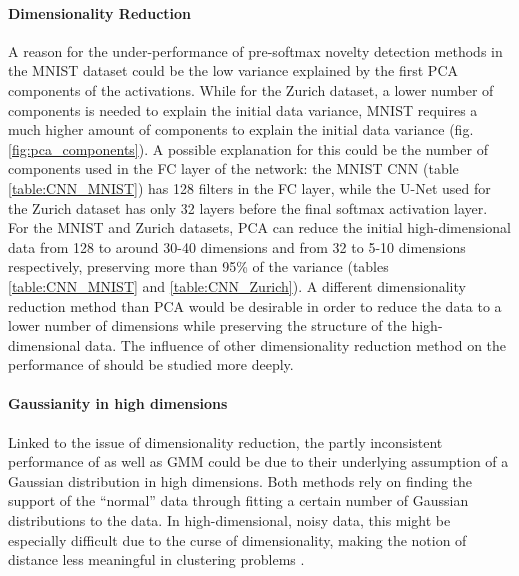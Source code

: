 \documentclass[10pt]{article}
\begin{document}
\paragraph{Dimensionality  Reduction} A reason for the under-performance of pre-softmax novelty detection methods in the \gls{MNIST} dataset could be the low variance explained by the first \gls{PCA} components of the activations. While for the Zurich dataset, a lower number of components is needed to explain the initial data variance, \gls{MNIST} requires a much higher amount of components to explain the initial data variance (fig. \ref{fig:pca_components}). A possible explanation for this could be the number of components used in the \gls{FC} layer of the network: the \gls{MNIST} \gls{CNN} (table \ref{table:CNN_MNIST}) has 128 filters in the \gls{FC} layer, while the U-Net used for the Zurich dataset has only 32 layers before the final softmax activation layer. For the \gls{MNIST} and Zurich datasets, \gls{PCA} can reduce the initial high-dimensional data from 128 to around 30-40 dimensions and from 32 to 5-10 dimensions respectively, preserving more than 95\% of the variance (tables \ref{table:CNN_MNIST} and \ref{table:CNN_Zurich}). A different dimensionality reduction method than \gls{PCA} would be desirable in order to reduce the data to a lower number of dimensions while preserving the structure of the  high-dimensional data. The influence of other dimensionality reduction method on the performance of  should be studied more deeply.

\paragraph{Gaussianity in high dimensions} Linked to the issue of dimensionality reduction, the partly inconsistent performance of  as well as \gls{GMM} could be due to their underlying assumption of a Gaussian distribution in high dimensions. Both methods rely on finding the support of the ``normal'' data through fitting a certain number of Gaussian distributions to the data. In high-dimensional, noisy data, this might be especially difficult due to the curse of dimensionality, making the notion of distance less meaningful in clustering problems \cite{Hinneburg2000WhatIT}.

\end{document}
